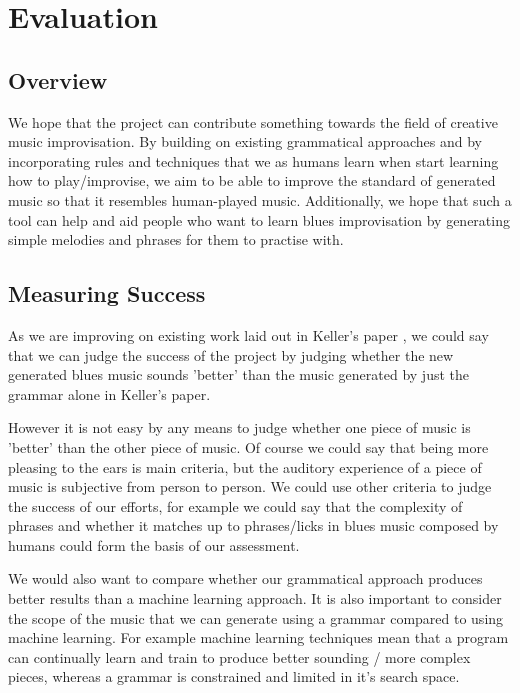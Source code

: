 \documentclass[pdftex,12pt,a4paper]{report}
\begin{document}
\chapter{Evaluation}

\section{Overview}
We hope that the project can contribute something towards the field of creative music improvisation. By building on existing grammatical approaches and by incorporating rules and techniques that we as humans learn when start learning how to play/improvise, we aim to be able to improve the standard of generated music so that it resembles human-played music. Additionally, we hope that such a tool can help and aid people who want to learn blues improvisation by generating simple melodies and phrases for them to practise with.  

\section{Measuring Success}
As we are improving on existing work laid out in Keller's paper \cite{keller07}, we could say that we can judge the success of the project by judging whether the new generated blues music sounds 'better' than the music generated by just the grammar alone in Keller's paper.

However it is not easy by any means to judge whether one piece of music is 'better' than the other piece of music. Of course we could say that being more pleasing to the ears is main criteria, but the auditory experience of a piece of music is subjective from person to person. We could use other criteria to judge the success of our efforts, for example we could say that the complexity of phrases and whether it matches up to phrases/licks in blues music composed by humans could form the basis of our assessment.

We would also want to compare whether our grammatical approach produces better results than a machine learning approach. It is also important to consider the scope of the music that we can generate using a grammar compared to using machine learning. For example machine learning techniques mean that a program can continually learn and train to produce better sounding / more complex pieces, whereas a grammar is constrained and limited in it's search space. 





\end{document}
